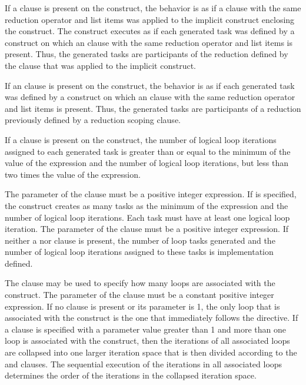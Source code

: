 If a  clause is present on the  construct, 
the behavior is as if a  clause with the same reduction 
operator and list items was applied to the implicit  construct 
enclosing the  construct. The  construct executes 
as if each generated task was defined by a  construct on which an 
 clause with the same reduction operator and list items is 
present. Thus, the generated tasks are participants of the reduction defined 
by the  clause that was applied to the implicit 
 construct.

If an  clause is present on the  construct, 
the behavior is as if each generated task was defined by a  
construct on which an  clause with the same reduction 
operator and list items is present. Thus, the generated tasks are participants 
of a reduction previously defined by a reduction scoping clause.

If a  clause is present on the  construct, the 
number of logical loop iterations assigned to each generated task is greater 
than or equal to the minimum of the value of the  expression 
and the number of logical loop iterations, but less than two times the value 
of the  expression.

The parameter of the  clause must be a positive integer expression.
If  is specified, the  construct creates as many 
tasks as the minimum of the  expression and the number of logical 
loop iterations. Each task must have at least one logical loop iteration.
The parameter of the  clause must be a positive integer expression.
If neither a  nor  clause is present, the number 
of loop tasks generated and the number of logical loop iterations assigned to 
these tasks is implementation defined.

The  clause may be used to specify how many loops are
associated with the  construct.  The parameter of the
 clause must be a constant positive integer
expression.  If no  clause is present or its parameter
is 1, the only loop that is associated with the 
construct is the one that immediately follows the 
directive.  If a  clause is specified with a parameter
value greater than 1 and more than one loop is associated with the
 construct, then the iterations of all associated loops
are collapsed into one larger iteration space that is then divided
according to the  and  clauses. The
sequential execution of the iterations in all associated loops
determines the order of the iterations in the collapsed iteration
space.

